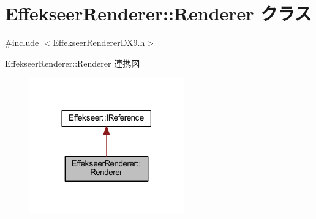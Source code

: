 \hypertarget{class_effekseer_renderer_1_1_renderer}{}\section{Effekseer\+Renderer\+:\+:Renderer クラス}
\label{class_effekseer_renderer_1_1_renderer}


{\ttfamily \#include $<$Effekseer\+Renderer\+D\+X9.\+h$>$}



Effekseer\+Renderer\+:\+:Renderer 連携図\nopagebreak
\begin{figure}[H]
\begin{center}
\leavevmode
\includegraphics[width=189pt]{class_effekseer_renderer_1_1_renderer__coll__graph}
\end{center}
\end{figure}
